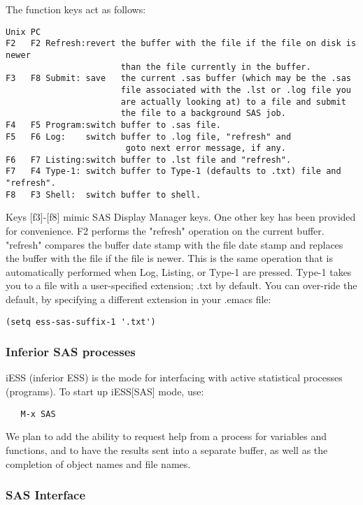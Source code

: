 \documentclass{article}
\begin{document}
The function keys act as follows:
\begin{verbatim}
Unix PC
F2   F2 Refresh:revert the buffer with the file if the file on disk is newer
                       than the file currently in the buffer.
F3   F8 Submit: save   the current .sas buffer (which may be the .sas
                       file associated with the .lst or .log file you
                       are actually looking at) to a file and submit
                       the file to a background SAS job.
F4   F5 Program:switch buffer to .sas file.
F5   F6 Log:    switch buffer to .log file, "refresh" and 
                        goto next error message, if any.
F6   F7 Listing:switch buffer to .lst file and "refresh".
F7   F4 Type-1: switch buffer to Type-1 (defaults to .txt) file and "refresh".
F8   F3 Shell:  switch buffer to shell.
\end{verbatim}

Keys [f3]-[f8] mimic SAS Display Manager keys.  One other key has been
provided for convenience.  F2 performs the "refresh" operation on the
current buffer.  "refresh" compares the buffer date stamp with the
file date stamp and replaces the buffer with the file if the file is
newer.  This is the same operation that is automatically performed
when Log, Listing, or Type-1 are pressed.  Type-1 takes you to a file
with a user-specified extension; .txt by default.  You can over-ride
the default, by specifying a different extension in your .emacs file:
\begin{verbatim}
(setq ess-sas-suffix-1 '.txt')
\end{verbatim}

\subsubsection{Inferior SAS processes}
\label{sec:SAS:proc}

iESS (inferior ESS) is the mode for interfacing with active
statistical processes (programs).  To start up iESS[SAS] mode, use:
\begin{verbatim}
   M-x SAS
\end{verbatim}   
We plan to add the ability to request help from a process for
variables and functions, and to have the results sent into a separate
buffer, as well as the completion of object names and file names.

\subsubsection{SAS Interface}
\label{sec:SAS:interface}
\end{document}
